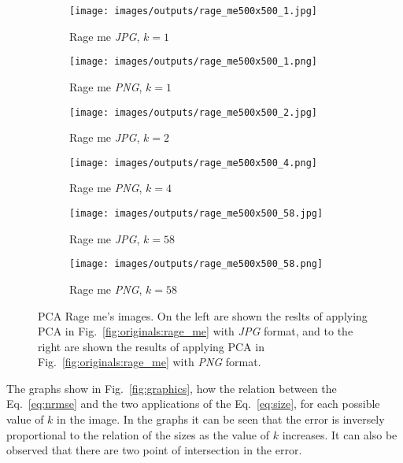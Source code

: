 \documentclass[journal]{IEEEtran}
\begin{document}
\begin{figure}
	\centering
	\begin{subfigure}{0.23\textwidth}
		\centering
		\texttt{[image: images/outputs/rage\_me500x500\_1.jpg]} 
		\caption{Rage me \textit{JPG}, $k=1$}
		\label{fig:outputs:rage_me_jpg_1} 
	\end{subfigure}
	\centering
	\begin{subfigure}{0.23\textwidth}
		\centering
		\texttt{[image: images/outputs/rage\_me500x500\_1.png]}
		\caption{Rage me \textit{PNG}, $k=1$}
		\label{fig:outputs:rage_me_png_1}
	\end{subfigure}

	\centering
	\begin{subfigure}{0.23\textwidth}
		\centering
		\texttt{[image: images/outputs/rage\_me500x500\_2.jpg]} 
		\caption{Rage me \textit{JPG}, $k=2$}
		\label{fig:outputs:rage_me_jpg_2} 
	\end{subfigure}
	\centering
	\begin{subfigure}{0.23\textwidth}
		\centering
		\texttt{[image: images/outputs/rage\_me500x500\_4.png]}
		\caption{Rage me \textit{PNG}, $k=4$}
		\label{fig:outputs:rage_me_png_4}
	\end{subfigure}
	
	\centering
	\begin{subfigure}{0.23\textwidth}
		\centering
		\texttt{[image: images/outputs/rage\_me500x500\_58.jpg]} 
		\caption{Rage me \textit{JPG}, $k=58$}
		\label{fig:outputs:rage_me_jpg_58} 
	\end{subfigure}
	\centering
	\begin{subfigure}{0.23\textwidth}
		\centering
		\texttt{[image: images/outputs/rage\_me500x500\_58.png]}
		\caption{Rage me \textit{PNG}, $k=58$}
		\label{fig:outputs:rage_me_png_58}
	\end{subfigure}
	
	
	\caption{PCA Rage me's images. On the left are shown the reslts of applying PCA in Fig.~\ref{fig:originals:rage_me} with \textit{JPG} format, and to the right are shown the results of applying PCA in Fig.~\ref{fig:originals:rage_me} with \textit{PNG} format.}
	\label{fig:outputs:rage_me}
\end{figure}



The graphs show in Fig.~\ref{fig:graphics}, how the relation between the Eq.~\ref{eq:nrmse} and the two applications of the Eq.~\ref{eq:size}, for each possible value of $k$ in the image. In the graphs it can be seen that the error is inversely proportional to the relation of the sizes as the value of $k$ increases. It can also be observed that there are two point of intersection in the error.
\end{document}
